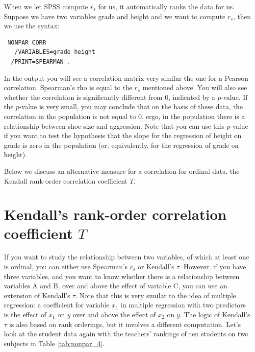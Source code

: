 \documentclass[]{book}\usepackage[]{graphicx}\usepackage[]{color}
\begin{document}
When we let SPSS compute $r_s$ for us, it automatically ranks the data for us. Suppose we have two variables grade and height and we want to compute $r_s$, then we use the syntax:

 \begin{verbatim}
 NONPAR CORR 
   /VARIABLES=grade height 
  /PRINT=SPEARMAN .
 \end{verbatim}
  
In the output you will see a correlation matrix very similar the one for a Pearson correlation. Spearman's rho is equal to the $r_s$ mentioned above. You will also see whether the correlation is significantly different from 0, indicated by a $p$-value. If the $p$-value is very small, you may conclude that on the basis of these data, the correlation in the population is not equal to 0, ergo, in the population there is a relationship between shoe size and aggression. Note that you can use this $p$-value if you want to test the hypothesis that the slope for the regression of height on grade is zero in the population (or, equivalently, for the regression of grade on height).  
  

Below we discuss an alternative measure for a correlation for ordinal data, the Kendall rank-order correlation coefficient $T$. 


\section{Kendall's rank-order correlation coefficient $T$}


If you want to study the relationship between two variables, of which at least one is ordinal, you can either use Spearman's $r_s$ or Kendall's $\tau$. However, if you have three variables, and you want to know whether there is a relationship between variables A and B, over and above the effect of variable C, you can use an extension of Kendall's $\tau$. Note that this is very similar to the idea of multiple regression: a coefficient for variable $x_1$ in multiple regression with two predictors is the effect of $x_1$ on $y$ over and above the effect of $x_2$ on $y$. The logic of Kendall's $\tau$ is also based on rank orderings, but it involves a different computation. Let's look at the student data again with the teachers' rankings of ten students on two subjects in Table \ref{tab:nonpar_4}. 
\end{document}

